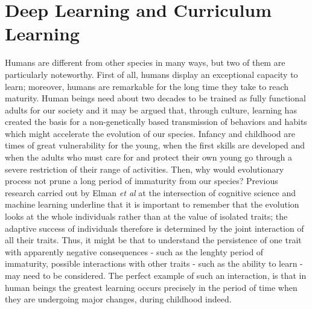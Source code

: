 \chapter{Deep Learning and Curriculum Learning}
Humans are different from other species in many ways, but two of them are particularly noteworthy. 
First of all, humans display an exceptional capacity to learn;
moreover, humans are remarkable for the long time they take to reach maturity. Human beings need about two decades to be trained as fully functional adults for our society and it may
be argued that, through culture, learning has created the basis for a non-genetically based transmission of behaviors and habits which might
accelerate the evolution of our species. Infancy and childhood are times of great vulnerability for the young, when the first skills are developed and when the adults who
must care for and protect their own young go through a severe restriction of their range of activities. Then, why would evolutionary process not prune a long period of 
immaturity from our species? Previous research carried out by Elman \textit{et al} \cite{ELMAN199371} at the intersection of cognitive science
and machine learning underline that it is important to remember that the evolution looks at the whole individuals rather than at the value of isolated traits; the adaptive success of individuals therefore is 
determined by the joint interaction of all their traits. Thus, it might be that to understand the persistence of one trait with apparently negative consequences - such as the lenghty period of immaturity, possible interactions
with other traits - such as the ability to learn - may need to be considered. The perfect example of such an interaction, is that in human beings the greatest learning occurs precisely in the period of time
when they are undergoing major changes, during childhood indeed.\\


